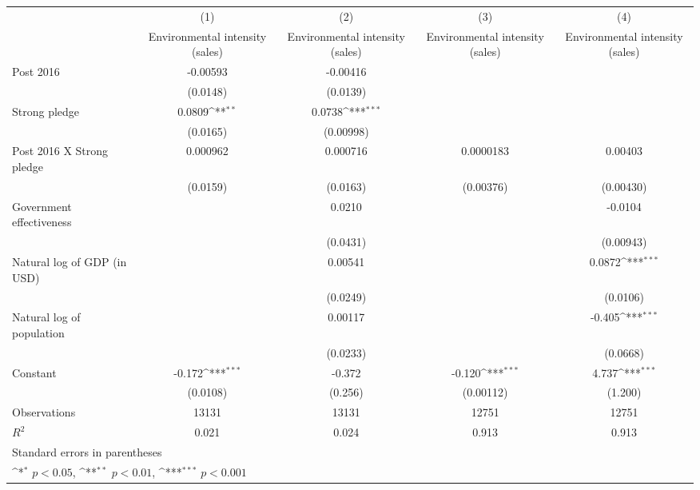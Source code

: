 {
\def\sym#1{\ifmmode^{#1}\else\(^{#1}\)\fi}
\begin{tabular}{l*{4}{c}}
\hline\hline
                    &\multicolumn{1}{c}{(1)}&\multicolumn{1}{c}{(2)}&\multicolumn{1}{c}{(3)}&\multicolumn{1}{c}{(4)}\\
                    &\multicolumn{1}{c}{Environmental intensity (sales)}&\multicolumn{1}{c}{Environmental intensity (sales)}&\multicolumn{1}{c}{Environmental intensity (sales)}&\multicolumn{1}{c}{Environmental intensity (sales)}\\
\hline
Post 2016           &    -0.00593         &    -0.00416         &                     &                     \\
                    &    (0.0148)         &    (0.0139)         &                     &                     \\
[1em]
Strong pledge       &      0.0809\sym{**} &      0.0738\sym{***}&                     &                     \\
                    &    (0.0165)         &   (0.00998)         &                     &                     \\
[1em]
Post 2016 X Strong pledge&    0.000962         &    0.000716         &   0.0000183         &     0.00403         \\
                    &    (0.0159)         &    (0.0163)         &   (0.00376)         &   (0.00430)         \\
[1em]
Government effectiveness&                     &      0.0210         &                     &     -0.0104         \\
                    &                     &    (0.0431)         &                     &   (0.00943)         \\
[1em]
Natural log of GDP (in USD)&                     &     0.00541         &                     &      0.0872\sym{***}\\
                    &                     &    (0.0249)         &                     &    (0.0106)         \\
[1em]
Natural log of population&                     &     0.00117         &                     &      -0.405\sym{***}\\
                    &                     &    (0.0233)         &                     &    (0.0668)         \\
[1em]
Constant            &      -0.172\sym{***}&      -0.372         &      -0.120\sym{***}&       4.737\sym{***}\\
                    &    (0.0108)         &     (0.256)         &   (0.00112)         &     (1.200)         \\
\hline
Observations        &       13131         &       13131         &       12751         &       12751         \\
\(R^{2}\)           &       0.021         &       0.024         &       0.913         &       0.913         \\
\hline\hline
\multicolumn{5}{l}{\footnotesize Standard errors in parentheses}\\
\multicolumn{5}{l}{\footnotesize \sym{*} \(p<0.05\), \sym{**} \(p<0.01\), \sym{***} \(p<0.001\)}\\
\end{tabular}
}
